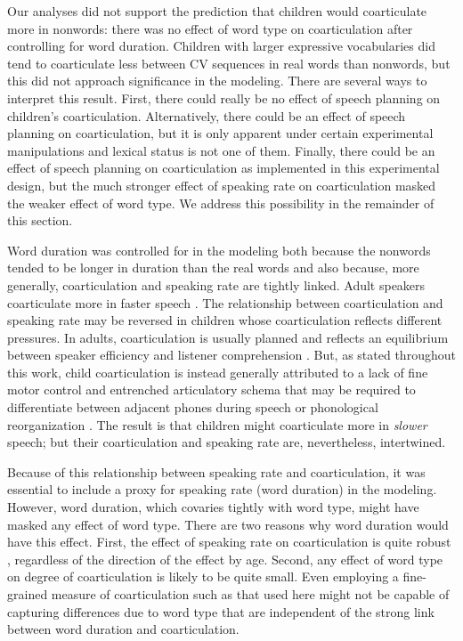 \documentclass[a4paper,man,natbib,donotrepeattitle, apacite]{apa6}
\begin{document}
Our analyses did not support the prediction that children would coarticulate more in nonwords: there was no effect of word type on coarticulation after controlling for word duration. Children with larger expressive vocabularies did tend to coarticulate less between CV sequences in real words than nonwords, but this did not approach significance in the modeling. There are several ways to interpret this result. First, there could really be no effect of speech planning on children’s coarticulation. Alternatively, there could be an effect of speech planning on coarticulation, but it is only apparent under certain experimental manipulations and lexical status is not one of them. Finally, there could be an effect of speech planning on coarticulation as implemented in this experimental design, but the much stronger effect of speaking rate on coarticulation masked the weaker effect of word type. We address this possibility in the remainder of this section.

Word duration was controlled for in the modeling both because the nonwords tended to be longer in duration than the real words and also because, more generally, coarticulation and speaking rate are tightly linked. Adult speakers coarticulate more in faster speech \cite{gayMechanismsControlSpeech1981,matthiesVariationAnticipatoryCoarticulation2001}. The relationship between coarticulation and speaking rate may be reversed in children whose coarticulation reflects different pressures.   In adults, coarticulation is usually planned \cite{whalenCoarticulationLargelyPlanned1990} and reflects an equilibrium between speaker efficiency and listener comprehension \cite{bradlowConfluentTalkerListeneroriented2002}. But, as stated throughout this work, child coarticulation is instead generally attributed to a lack of fine motor control and entrenched articulatory schema that may be required to differentiate between adjacent phones during speech \cite{goffmanRelationsSegmentalMotor2007,greenPhysiologicDevelopmentSpeech2000,mcallisterbyunMotorInfluencesGrammar2016} or phonological reorganization \cite{nittrouerEmergencePhoneticSegments1989,nittrouerHowChildrenLearn1996,noiraySpokenLanguageDevelopment2019,redfordGrammaticalWordProduction2018,zharkovaCoarticulationIndicatorSpeech2011}. The result is that children might coarticulate more in \textit{slower} speech; but their coarticulation and speaking rate are, nevertheless, intertwined. 

Because of this relationship between speaking rate and coarticulation, it was essential to include a proxy for speaking rate (word duration) in the modeling. However, word duration, which covaries tightly with word type,  might have masked any effect of word type. There are two reasons why word duration would have this effect. First, the effect of speaking rate on coarticulation is quite robust \cite{gayMechanismsControlSpeech1981,matthiesVariationAnticipatoryCoarticulation2001}, regardless of the direction of the effect by age. Second, any effect of word type on degree of coarticulation is likely to be quite small. Even employing a fine-grained measure of coarticulation such as that used here might not be capable of capturing differences due to word type that are independent of the strong link between word duration and coarticulation. 
\end{document}
